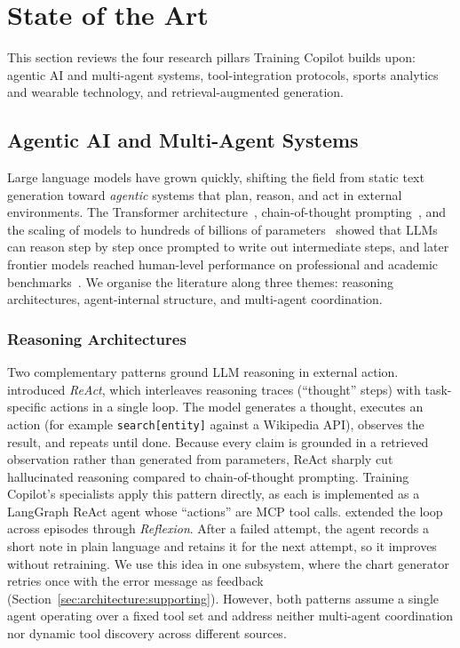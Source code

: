 \section{State of the Art}\label{sec:sota}

This section reviews the four research pillars Training Copilot builds upon: agentic AI and multi-agent systems, tool-integration protocols, sports analytics and wearable technology, and retrieval-augmented generation.

\subsection{Agentic AI and Multi-Agent Systems}\label{sec:sota:agents}

Large language models have grown quickly, shifting the field from static text generation toward \textit{agentic} systems that plan, reason, and act in external environments. The Transformer architecture~\citep{vaswani_attention_2017}, chain-of-thought prompting~\citep{wei_chain-of-thought_2022}, and the scaling of models to hundreds of billions of parameters~\citep{brown_gpt3_2020} showed that LLMs can reason step by step once prompted to write out intermediate steps, and later frontier models reached human-level performance on professional and academic benchmarks~\citep{openai_gpt4_2023}. We organise the literature along three themes: reasoning architectures, agent-internal structure, and multi-agent coordination.

\subsubsection{Reasoning Architectures}

Two complementary patterns ground LLM reasoning in external action. \cite{yao_react_2023} introduced \textit{ReAct}, which interleaves reasoning traces (``thought'' steps) with task-specific actions in a single loop. The model generates a thought, executes an action (for example \texttt{search[entity]} against a Wikipedia API), observes the result, and repeats until done. Because every claim is grounded in a retrieved observation rather than generated from parameters, ReAct sharply cut hallucinated reasoning compared to chain-of-thought prompting. Training Copilot's specialists apply this pattern directly, as each is implemented as a LangGraph ReAct agent whose ``actions'' are MCP tool calls. \cite{shinn_reflexion_2023} extended the loop across episodes through \textit{Reflexion}. After a failed attempt, the agent records a short note in plain language and retains it for the next attempt, so it improves without retraining. We use this idea in one subsystem, where the chart generator retries once with the error message as feedback (Section~\ref{sec:architecture:supporting}). However, both patterns assume a single agent operating over a fixed tool set and address neither multi-agent coordination nor dynamic tool discovery across different sources.

